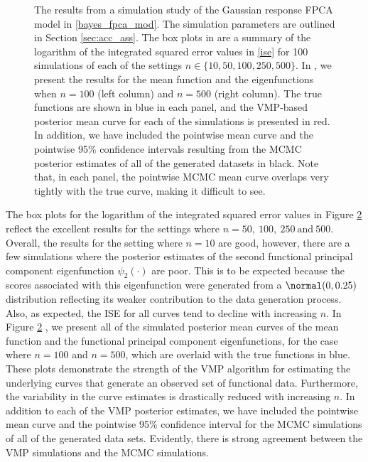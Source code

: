 \documentclass[12pt]{article}
\theoremstyle{plain}
\theoremstyle{definition}
\theoremstyle{remark}
\begin{document}
\begin{figure}
\begin{subfigure}[t]{0.49\textwidth}
	\caption{}
	\label{subfig:bf_sims}
	\end{subfigure}
\caption{
	The results from a simulation study of the Gaussian response FPCA model in \eqref{bayes_fpca_mod}. The
	simulation parameters are outlined in Section \ref{sec:acc_ass}.
	The box plots in  are a summary of the logarithm of the
	integrated squared error values in \eqref{ise}
	for 100 simulations of each of the settings $n \in \{ 10, 50, 100, 250, 500 \}$.
	In , we present the results for the mean function and the eigenfunctions when
	$n = 100$ (left column) and $n = 500$ (right column). The true functions are shown in blue in each panel,
	and the VMP-based posterior mean curve for each of the simulations is presented in red. In addition, we have
	included the pointwise mean curve and the pointwise 95\% confidence intervals resulting from the MCMC
	posterior estimates of all of the generated datasets in black. Note that, in each panel,
	the pointwise MCMC mean curve overlaps very tightly with the true curve,
	making it difficult to see.
}
\label{fig:gauss_resp_sim_st}
\end{figure}

The box plots for the logarithm of the integrated squared error values
in Figure \ref{fig:gauss_resp_sim_st}  reflect the excellent results for the
settings where $n = 50, \ 100, \ 250 \ \text{and} \ 500$.
Overall, the results for the setting where $n = 10$ are good, however,
there are a few simulations where the posterior estimates of the second functional principal component
eigenfunction $\psi_2 (\cdot)$ are poor. This is to be expected because the scores
associated with this eigenfunction were generated from a $\normal (0, 0.25)$ distribution reflecting its weaker
contribution to the data generation process. Also, as expected, the ISE for all curves tend to decline with
increasing $n$. In Figure \ref{fig:gauss_resp_sim_st} , we present all of the simulated
posterior mean curves of
the mean function and the functional principal component eigenfunctions, for the case where $n = 100$
and $n = 500$, which are
overlaid with the true functions in blue. These plots demonstrate the strength of the VMP algorithm for estimating
the underlying curves that generate an observed set of functional data. Furthermore, the variability in the curve
estimates is drastically reduced with increasing $n$. In addition to each of the VMP posterior
estimates, we have included the pointwise mean curve and the pointwise 95\% confidence interval for the MCMC
simulations of all of the generated data sets. Evidently, there is strong agreement between the VMP simulations
and the MCMC simulations.
\end{document}
